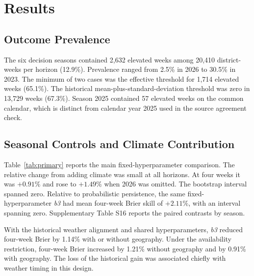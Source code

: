 \documentclass[journal]{IEEEtran}
\newcommand{\bthree}{\textit{b3}}
\begin{document}
\section{Results}

\subsection{Outcome Prevalence}
The six decision seasons contained 2,632 elevated weeks among 20,410 district-weeks per horizon (12.9\%). Prevalence ranged from 2.5\% in 2026 to 30.5\% in 2023. The minimum of two cases was the effective threshold for 1,714 elevated weeks (65.1\%). The historical mean-plus-standard-deviation threshold was zero in 13,729 weeks (67.3\%). Season 2025 contained 57 elevated weeks on the common calendar, which is distinct from calendar year 2025 used in the source agreement check.

\subsection{Seasonal Controls and Climate Contribution}
Table~\ref{tab:primary} reports the main fixed-hyperparameter comparison. The relative change from adding climate was small at all horizons. At four weeks it was $+0.91\%$ and rose to $+1.49\%$ when 2026 was omitted. The bootstrap interval spanned zero. Relative to probabilistic persistence, the same fixed-hyperparameter \bthree{} had mean four-week Brier skill of $+2.11\%$, with an interval spanning zero. Supplementary Table S16 reports the paired contrasts by season.

With the historical weather alignment and shared hyperparameters, \bthree{} reduced four-week Brier by 1.14\% with or without geography. Under the availability restriction, four-week Brier increased by 1.21\% without geography and by 0.91\% with geography. The loss of the historical gain was associated chiefly with weather timing in this design.
\end{document}
